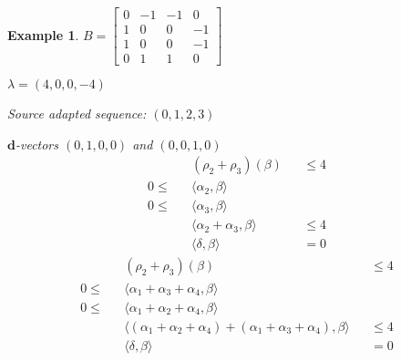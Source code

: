 \documentclass{amsart}
\newtheorem{example}[theorem]{Example}
\numberwithin{theorem}{section}
\newcommand{\bfd}{\boldsymbol{d}}
\begin{document}
\begin{example}
  $B = \left[\begin{array}{cccc} 0 & -1 & -1 & 0 \\ 1 & 0 & 0 & -1 \\ 1 & 0 & 0 & -1 \\ 0 & 1 & 1 & 0 \end{array}\right]$ 

  $\lambda = (4,0,0,-4)$

  Source adapted sequence: $(0,1,2,3)$


  $\bfd$-vectors $(0,1,0,0)$ and $(0,0,1,0)$
  \begin{align*}
    && (\rho_2+\rho_3)(\beta) &&\leq 4\\
    0 \leq && \langle \alpha_2, \beta \rangle &&\\
    0 \leq && \langle \alpha_3, \beta \rangle &&\\
    && \langle \alpha_2+\alpha_3, \beta \rangle && \leq 4\\
    && \langle \delta,\beta \rangle &&= 0
  \end{align*}
  \begin{align*}
    && (\rho_2+\rho_3)(\beta) &&\leq 4\\
    0 \leq && \langle \alpha_1+\alpha_3+\alpha_4, \beta \rangle &&\\
    0 \leq && \langle \alpha_1+\alpha_2+\alpha_4, \beta \rangle &&\\
    && \langle (\alpha_1+\alpha_2+\alpha_4)+(\alpha_1+\alpha_3+\alpha_4), \beta \rangle && \leq 4\\
    && \langle \delta,\beta \rangle &&= 0
  \end{align*}
\end{example}
\end{document}
